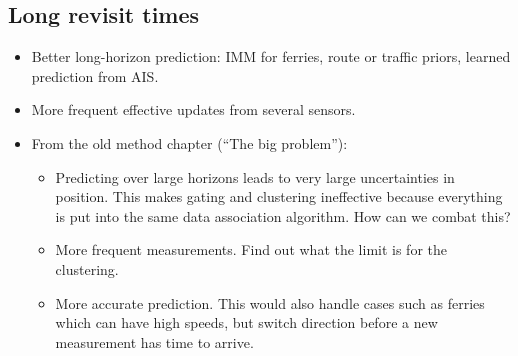 \subsection{Long revisit times}
\begin{itemize}
    \item Better long-horizon prediction: IMM for ferries, route or traffic priors, learned prediction from AIS.
    \item More frequent effective updates from several sensors.
    \item From the old method chapter (``The big problem''):
    \begin{itemize}
    \item Predicting over large horizons leads to very large uncertainties in position. This makes gating and clustering ineffective because everything is put into the same data association algorithm. How can we combat this? 
    \item More frequent measurements. Find out what the limit is for the clustering.
    \item More accurate prediction. This would also handle cases such as ferries which can have high speeds, but switch direction before a new measurement has time to arrive. 
    \end{itemize}
\end{itemize}
